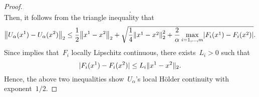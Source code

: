 \documentclass[../../main]{subfiles}
\begin{document}
\begin{proof}
\begin{equation}
    .\end{equation} 
    Then, it follows from the triangle inequality that
    \begin{equation}
        \norm*{U_\alpha(x^1) - U_\alpha(x^2)}_2 \le \frac{1}{2} \norm*{x^1 - x^2}_2 + \sqrt{\frac{1}{4} \norm*{x^1 - x^2}_2^2 + \frac{2}{\alpha} \max_{i = 1, \dots, m} \abs*{F_i(x^1) - F_i(x^2)}}
    .\end{equation} 
    Since  implies that~$F_i$ locally Lipschitz continuous, there exists~$L_i > 0$ such that
    \begin{equation} \label{eq:cont_u_alpha:local_Lipschitz}
        \lvert F_i(x^1) - F_i(x^2)\rvert \le L_i \lVert x^1 - x^2\rVert_2
    .\end{equation} 
    Hence, the above two inequalities show~$U_\alpha$'s local H\"older continuity with exponent~$1 / 2$.


\end{proof}
\end{document}
